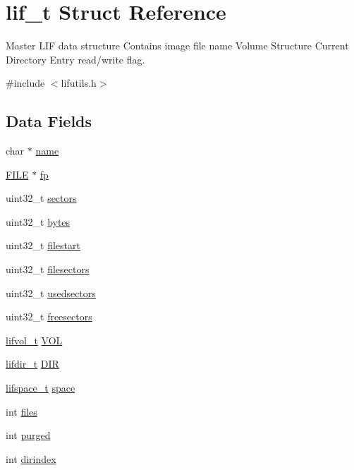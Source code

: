 \hypertarget{structlif__t}{}\section{lif\+\_\+t Struct Reference}
\label{structlif__t}


Master L\+IF data structure Contains image file name Volume Structure Current Directory Entry read/write flag.  




{\ttfamily \#include $<$lifutils.\+h$>$}

\subsection*{Data Fields}
\begin{DoxyCompactItemize}
\item 
char $\ast$ \hyperlink{structlif__t_ae6b943f3c26005fc375169960e9049f7}{name}
\item 
\hyperlink{posix_8h_aed4dabeb9f7c518ded42f930a04abce8}{F\+I\+LE} $\ast$ \hyperlink{structlif__t_ad679ba16ca21371a649981a4cca9e64c}{fp}
\item 
uint32\+\_\+t \hyperlink{structlif__t_a262b14d8547abff49d9dd1b445faf6d5}{sectors}
\item 
uint32\+\_\+t \hyperlink{structlif__t_a46964ae5e810fad047ead39465e9514c}{bytes}
\item 
uint32\+\_\+t \hyperlink{structlif__t_a3c1bcc66b694d07ebc304ef7cb66b4ef}{filestart}
\item 
uint32\+\_\+t \hyperlink{structlif__t_a1223702cce63f879654d51773243643d}{filesectors}
\item 
uint32\+\_\+t \hyperlink{structlif__t_ad81767a2f65b997d5abecba130b89814}{usedsectors}
\item 
uint32\+\_\+t \hyperlink{structlif__t_a1fc11461eb5643d84e229772f7623152}{freesectors}
\item 
\hyperlink{structlifvol__t}{lifvol\+\_\+t} \hyperlink{structlif__t_ae68126d2b9261ef9a6903a95d5c82cac}{V\+OL}
\item 
\hyperlink{structlifdir__t}{lifdir\+\_\+t} \hyperlink{structlif__t_aefeaa526c04a2b8715b0392feeec52a3}{D\+IR}
\item 
\hyperlink{structlifspace__t}{lifspace\+\_\+t} \hyperlink{structlif__t_a627408f7370fc24c1b4839f7976b72dd}{space}
\item 
int \hyperlink{structlif__t_aceca398e2e3f6bcffe1593969544d546}{files}
\item 
int \hyperlink{structlif__t_a1dfef3ca99d6ba9680bb9b6bf8fafc32}{purged}
\item 
int \hyperlink{structlif__t_a74f8af3dc203c3c6b9dea3829bb4b6fa}{dirindex}
\end{DoxyCompactItemize}


